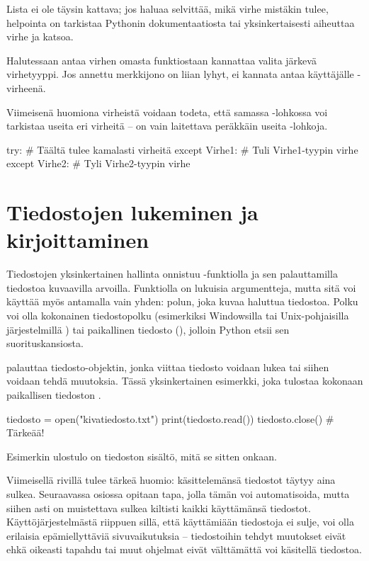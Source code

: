 Lista ei ole täysin kattava; jos haluaa selvittää, mikä virhe mistäkin tulee, helpointa on tarkistaa Pythonin dokumentaatiosta tai yksinkertaisesti aiheuttaa virhe ja katsoa.

Halutessaan antaa virhen omasta funktiostaan kannattaa valita järkevä virhetyyppi. Jos annettu merkkijono on liian lyhyt, ei kannata antaa käyttäjälle -virheenä.

Viimeisenä huomiona virheistä voidaan todeta, että samassa -lohkossa voi tarkistaa useita eri virheitä -- on vain laitettava peräkkäin useita -lohkoja.

\begin{python}
try:
	# Täältä tulee kamalasti virheitä
except Virhe1:
	# Tuli Virhe1-tyypin virhe
except Virhe2:
	# Tyli Virhe2-tyypin virhe
\end{python}

\section{Tiedostojen lukeminen ja kirjoittaminen}

Tiedostojen yksinkertainen hallinta onnistuu -funktiolla ja sen palauttamilla tiedostoa kuvaavilla arvoilla. Funktiolla on lukuisia argumentteja, mutta sitä voi käyttää myös antamalla vain yhden: polun, joka kuvaa haluttua tiedostoa. Polku voi olla kokonainen tiedostopolku (esimerkiksi Windowsilla  tai Unix-pohjaisilla järjestelmillä ) tai paikallinen tiedosto (), jolloin Python etsii sen suorituskansiosta.

 palauttaa tiedosto-objektin, jonka viittaa tiedosto voidaan lukea tai siihen voidaan tehdä muutoksia. Tässä yksinkertainen esimerkki, joka tulostaa kokonaan paikallisen tiedoston .

\begin{python}
tiedosto = open("kivatiedosto.txt")
print(tiedosto.read())
tiedosto.close() # Tärkeää!
\end{python}

Esimerkin ulostulo on tiedoston  sisältö, mitä se sitten onkaan.

Viimeisellä rivillä tulee tärkeä huomio: käsittelemänsä tiedostot täytyy aina sulkea. Seuraavassa osiossa opitaan tapa, jolla tämän voi automatisoida, mutta siihen asti on muistettava sulkea kiltisti kaikki käyttämänsä tiedostot. Käyttöjärjestelmästä riippuen sillä, että käyttämiään tiedostoja ei sulje, voi olla erilaisia epämiellyttäviä sivuvaikutuksia -- tiedostoihin tehdyt muutokset eivät ehkä oikeasti tapahdu tai muut ohjelmat eivät välttämättä voi käsitellä tiedostoa.

